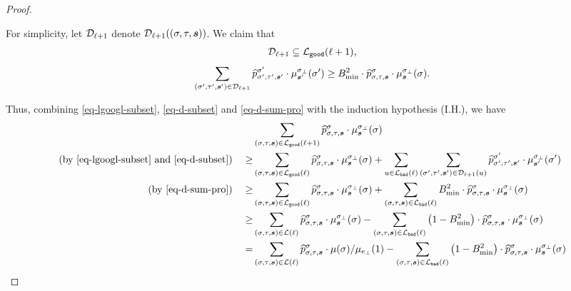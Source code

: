 \documentclass[11pt]{article}
\def\!#1{\mathtt{#1}}
\newcommand{\seqS}{\boldsymbol{s}}
\begin{document}
\begin{proof}
\begin{itemize}
For simplicity, let $\mathcal{D}_{\ell+1}$ denote $\+D_{\ell+1}((\sigma,\tau,\seqS))$.
We claim that 
\begin{align}\label{eq-d-subset}
\+D_{\ell+1}\subseteq \+L_{\!{good}}(\ell+1),
\end{align}
\begin{align}\label{eq-d-sum-pro}
\sum_{(\sigma',\tau',\seqS')\in \+D_{\ell+1}} \widehat{p}^{\sigma'}_{\sigma',\tau',\seqS'}\cdot \mu^{\sigma_{\bot}}_{\seqS'}(\sigma') \geq B_{\min}^2\cdot\widehat{p}^{\sigma}_{\sigma,\tau,\seqS}\cdot \mu^{\sigma_{\bot}}_{\seqS}(\sigma).
\end{align}
\end{itemize}
Thus, combining \eqref{eq-lgoogl-subset}, \eqref{eq-d-subset} and \eqref{eq-d-sum-pro} with the induction hypothesis (I.H.), we have 
\begin{equation}\label{eq-sum-good-leaf}
\begin{aligned}
    &\sum_{(\sigma,\tau, \seqS)\in \+L_{\!{good}}(\ell+1)}\widehat{p}^{\sigma}_{\sigma,\tau,\seqS}\cdot \mu^{\sigma_{\bot}}_{\seqS}(\sigma)\\
\left(\text{by \eqref{eq-lgoogl-subset} and \eqref{eq-d-subset}}\right) \quad   \geq &\sum_{(\sigma,\tau, \seqS)\in \+L_{\!{good}}(\ell)}\widehat{p}^{\sigma}_{\sigma,\tau,\seqS}\cdot \mu^{\sigma_{\bot}}_{\seqS}(\sigma) + \sum_{u\in \+L_{\!{bad}}(\ell)}\sum_{(\sigma',\tau',\seqS')\in \+D_{\ell+1}(u)} \widehat{p}^{\sigma'}_{\sigma',\tau',\seqS'}\cdot \mu^{\sigma_{\bot}}_{\seqS'}(\sigma')\\
\left(\text{by \eqref{eq-d-sum-pro}}\right) \quad    \geq & \sum_{(\sigma,\tau, \seqS)\in \+L_{\!{good}}(\ell)}\widehat{p}^{\sigma}_{\sigma,\tau,\seqS}\cdot \mu^{\sigma_{\bot}}_{\seqS}(\sigma) + \sum_{(\sigma,\tau, \seqS)\in \+L_{\!{bad}}(\ell)}B_{\min}^2\cdot\widehat{p}^{\sigma}_{\sigma,\tau,\seqS}\cdot \mu^{\sigma_{\bot}}_{\seqS}(\sigma)\\
    \geq & \sum_{(\sigma,\tau, \seqS)\in \+L(\ell)}\widehat{p}^{\sigma}_{\sigma,\tau,\seqS}\cdot \mu^{\sigma_{\bot}}_{\seqS}(\sigma) - \sum_{(\sigma,\tau, \seqS)\in \+L_{\!{bad}}(\ell)}\left(1-B_{\min}^2\right)\cdot\widehat{p}^{\sigma}_{\sigma,\tau,\seqS}\cdot \mu^{\sigma_{\bot}}_{\seqS}(\sigma)\\
    = & \sum_{(\sigma,\tau, \seqS)\in \+L(\ell)}\widehat{p}^{\sigma}_{\sigma,\tau,\seqS}\cdot \mu(\sigma)/\mu_{e_{\bot}}(1) - \sum_{(\sigma,\tau, \seqS)\in \+L_{\!{bad}}(\ell)}\left(1-B_{\min}^2\right)\cdot\widehat{p}^{\sigma}_{\sigma,\tau,\seqS}\cdot \mu^{\sigma_{\bot}}_{\seqS}(\sigma)\\

\end{aligned}
\end{equation}
\end{proof}
\end{document}
